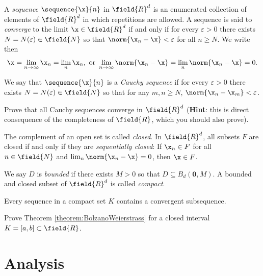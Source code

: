 
A \emph{sequence} $\sequence{\x}{n}$ in $\field{R}^d$ is an enumerated collection of elements of $\field{R}^d$ in which repetitions are allowed.  A sequence is said to \emph{converge} to the limit $\x \in \field{R}^d$ if and only if for every $\varepsilon>0$ there exists $N=N(\varepsilon) \in \field{N}$ so that $\norm{\x_n - \x} < \varepsilon$ for all $n \geq N$.  We write then 
\begin{equation*}
\x = \lim_{n\to\infty} \x_n = \lim_n \x_n, \text{ or } \lim_{n\to\infty} \norm{\x_n - \x} = \lim_n \norm{\x_n - \x} = 0.
\end{equation*}

We say that $\sequence{\x}{n}$ is a \emph{Cauchy sequence} if for every $\varepsilon>0$ there exists $N = N(\varepsilon) \in \field{N}$ so that for any $m,n \geq N$, $\norm{\x_n - \x_m} < \varepsilon$.  

\begin{problem}\label{problem:Rdcomplete}
Prove that all Cauchy sequences converge in $\field{R}^d$ (\textbf{Hint}: this is direct consequence of the completeness of $\field{R}$, which you should also prove).
\end{problem}

The complement of an open set is called \emph{closed}. In $\field{R}^d$, all subsets $F$ are closed if and only if they are \emph{sequentially closed}: If $\x_n\in F$ for all $n \in \field{N}$ and $\lim_n \norm{\x_n - \x} = 0$, then $\x \in F$.

We say $D$ is \emph{bounded} if there exists $M>0$ so that $D \subseteq B_d(\boldsymbol{0}, M)$.  A bounded and closed subset of $\field{R}^d$ is called \emph{compact}.

\begin{theorem}\label{theorem:BolzanoWeierstrass}
Every sequence in a compact set $K$ contains a convergent subsequence.
\end{theorem}

\begin{problem}\label{problem:BolzanoWeierstrass}
Prove Theorem \ref{theorem:BolzanoWeierstrass} for a closed interval $K=[a,b] \subset \field{R}$.
\end{problem}

\section{Analysis}

